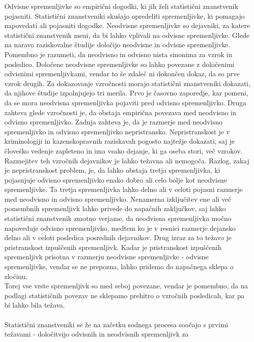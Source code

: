 \documentclass[fin1, tisk]{fmfdelo}
\theoremstyle{definition}
\theoremstyle{trditev}
\theoremstyle{izrek}
\begin{document}
Odvisne spremenljivke so empirični dogodki, ki jih želi statistični znanstvenik pojasniti. Statistični znanstveniki skušajo opredeliti spremenljivke, ki pomagajo
napovedati ali pojasniti dogodke. Neodvisne spremenljivke so dejavniki, za katere statistični znanstvenik meni, da bi lahko vplivali na odvisne
spremenljivke. Glede na naravo raziskovalne študije določijo neodvisne in odvisne spremenljivke.\\
Pomembno je razumeti, da neodvisno in odvisno nista sinonima za vzrok in posledico. Določene neodvisne spremenljivke so lahko povezane z
določenimi odvisnimi spremenljivkami, vendar to še zdaleč ni dokončen dokaz, da so prve vzrok drugih. Za dokazovanje vzročnosti morajo
statistični znanstveniki dokazati, da njihove študije izpolnjujejo tri merila. Prvo je časovno zaporedje, kar pomeni, da se mora neodvisna spremenljivka
pojaviti pred odvisno spremenljivko. Druga zahteva glede vzročnosti je, da obstaja empirična povezava med neodvisno in odvisno spremenljivko.
Zadnja zahteva je, da je razmerje med neodvisno spremenljivko in odvisno spremenljivko nepristransko. Nepristranskost je v kriminologiji in
kazenskopravnih raziskavah pogosto najtežje dokazati, saj je človeško vedenje zapleteno in ima vsako dejanje, ki ga oseba stori, več vzrokov.
Razmejitev teh vzročnih dejavnikov je lahko težavna ali nemogoča. Razlog, zakaj je nepristranskost problem, je, da lahko obstaja tretja
spremenljivka, ki pojasnjuje odvisno spremenljivko enako dobro ali celo bolje kot neodvisne spremenljivke. Ta tretja spremenljivka lahko delno
ali v celoti pojasni razmerje med neodvisno in odvisno spremenljivko. Nenamerna izključitev ene ali več pomembnih spremenljivk lahko privede do
napačnih zaključkov, saj lahko statistični znanstvenik zmotno verjame, da neodvisna spremenljivka močno napoveduje odvisno spremenljivko, medtem ko je v
resnici razmerje dejansko delno ali v celoti posledica posrednih dejavnikov. Drug izraz za to težavo je pristranskost izpuščenih spremenljivk.
Kadar je pristranskost izpuščenih spremenljivk prisotna v razmerju neodvisne spremenljivke - odvisne spremenljivke, vendar se ne prepozna, lahko
pridemo do napačnega sklepa o zločinu.\\
Torej vse vrste spremenljivk so med seboj povezane, vendar je pomembno, da na podlagi statističnih povezav ne sklepamo prehitro o vzročnih posledicah,
kar pa bi lahko bila težava.\\\\
Statistični znanstveniki se že na začetku sodnega procesa soočajo s prvimi težavami - določitvijo odvisnih in neodvisnih spremenljivk za
\end{document}
